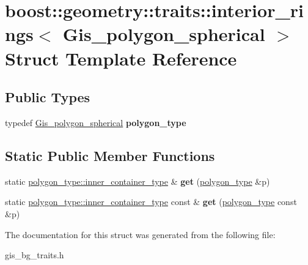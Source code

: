 \hypertarget{structboost_1_1geometry_1_1traits_1_1interior__rings_3_01Gis__polygon__spherical_01_4}{}\section{boost\+:\+:geometry\+:\+:traits\+:\+:interior\+\_\+rings$<$ Gis\+\_\+polygon\+\_\+spherical $>$ Struct Template Reference}
\label{structboost_1_1geometry_1_1traits_1_1interior__rings_3_01Gis__polygon__spherical_01_4}
\subsection*{Public Types}
\begin{DoxyCompactItemize}
\item 
\mbox{\label{structboost_1_1geometry_1_1traits_1_1interior__rings_3_01Gis__polygon__spherical_01_4_aa47219df03c2c423b4b2671a1281b045}} 
typedef \mbox{\hyperlink{classGis__polygon__spherical}{Gis\+\_\+polygon\+\_\+spherical}} {\bfseries polygon\+\_\+type}
\end{DoxyCompactItemize}
\subsection*{Static Public Member Functions}
\begin{DoxyCompactItemize}
\item 
\mbox{\label{structboost_1_1geometry_1_1traits_1_1interior__rings_3_01Gis__polygon__spherical_01_4_a48b40a27141097f75bcfb0063290cdb5}} 
static \mbox{\hyperlink{classGis__wkb__vector}{polygon\+\_\+type\+::inner\+\_\+container\+\_\+type}} \& {\bfseries get} (\mbox{\hyperlink{classGis__polygon__spherical}{polygon\+\_\+type}} \&p)
\item 
\mbox{\label{structboost_1_1geometry_1_1traits_1_1interior__rings_3_01Gis__polygon__spherical_01_4_a9cae4abe72723d874df4b77661de2276}} 
static \mbox{\hyperlink{classGis__wkb__vector}{polygon\+\_\+type\+::inner\+\_\+container\+\_\+type}} const  \& {\bfseries get} (\mbox{\hyperlink{classGis__polygon__spherical}{polygon\+\_\+type}} const \&p)
\end{DoxyCompactItemize}


The documentation for this struct was generated from the following file\+:\begin{DoxyCompactItemize}
\item 
gis\+\_\+bg\+\_\+traits.\+h\end{DoxyCompactItemize}
